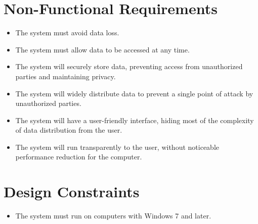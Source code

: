 \section {Non-Functional Requirements}
	\begin{itemize}
		\item The system must avoid data loss.

		\item The system must allow data to be accessed at any time.

		\item The system will securely store data, preventing access from unauthorized parties and maintaining privacy.

		\item The system will widely distribute data to prevent a single point of attack by unauthorized parties.

		\item The system will have a user-friendly interface, hiding most of the complexity of data distribution from the user.

		\item The system will run transparently to the user, without noticeable performance reduction for the computer.
	\end{itemize}

\section {Design Constraints}
	\begin{itemize}
		\item The system must run on computers with Windows 7 and later.

		
	\end{itemize}
